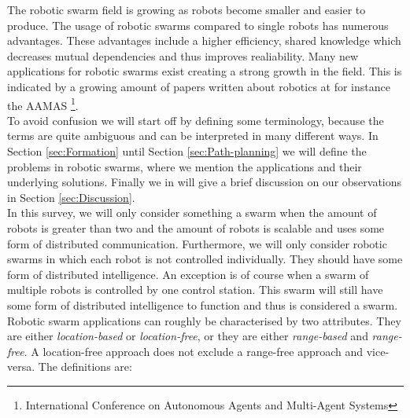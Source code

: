 The robotic swarm field is growing as robots become smaller and easier to produce.
The usage of robotic swarms compared to single robots has numerous advantages. 
These advantages include a higher efficiency, shared knowledge which decreases mutual dependencies and thus improves realiability.
Many new applications for robotic swarms exist creating a strong growth in the field.
This is indicated by a growing amount of papers written about robotics at for instance the AAMAS \footnote{International Conference on Autonomous Agents and Multi-Agent Systems}.\cite{Amigoni2014}\\

To avoid confusion we will start off by defining some terminology, because the terms are quite ambiguous and can be interpreted in many different ways.
In Section \ref{sec:Formation} until Section \ref{sec:Path-planning} we will define the problems in robotic swarms, where we mention the applications and their underlying solutions.
Finally we in will give a brief discussion on our observations in Section \ref{sec:Discussion}.\\

In this survey, we will only consider something a swarm when the amount of robots is greater than two and the amount of robots is scalable and uses some form of distributed communication.
Furthermore, we will only consider robotic swarms in which each robot is not controlled individually.
They should have some form of distributed intelligence.
An exception is of course when a swarm of multiple robots is controlled by one control station.
This swarm will still have some form of distributed intelligence to function and thus is considered a swarm.  \\

Robotic swarm applications can roughly be characterised by two attributes. They are either \emph{location-based} or \emph{location-free}, or they are either \emph{range-based} and  \emph{range-free}.
A location-free approach does not exclude a range-free approach and vice-versa. 
The definitions are:

